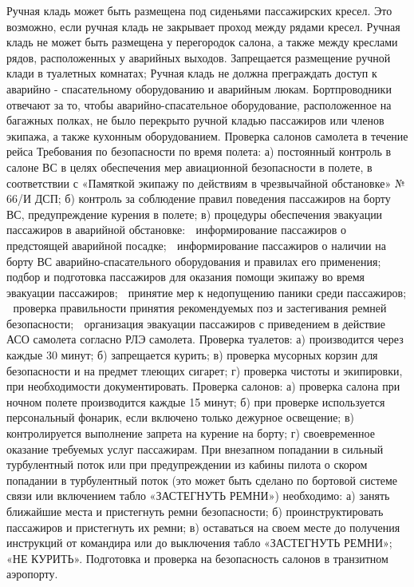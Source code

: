 Ручная кладь может быть размещена под сиденьями пассажирских кресел. Это возможно, если ручная кладь не закрывает проход между рядами кресел.
Ручная кладь не может быть размещена у перегородок салона, а также между креслами рядов, расположенных у аварийных выходов.
Запрещается размещение ручной клади в туалетных комнатах;
Ручная кладь не должна преграждать доступ к аварийно - спасательному оборудованию и аварийным люкам. Бортпроводники отвечают за то, чтобы аварийно-спасательное оборудование, расположенное на багажных полках, не было перекрыто ручной кладью пассажиров или членов экипажа, а также кухонным оборудованием.
Проверка салонов самолета в течение рейса
Требования по безопасности по время полета:
а)	постоянный контроль в салоне ВС в целях обеспечения мер авиационной безопасности в полете, в соответствии с «Памяткой экипажу по действиям в чрезвычайной обстановке» № 66/И ДСП;
б)	контроль за соблюдение правил поведения пассажиров на борту ВС, предупреждение курения в полете;
в)	процедуры обеспечения эвакуации пассажиров в аварийной обстановке:
	информирование пассажиров о предстоящей аварийной посадке;
	информирование пассажиров о наличии на борту ВС аварийно-спасательного оборудования и правилах его применения;
	подбор и подготовка пассажиров для оказания помощи экипажу во время эвакуации пассажиров;
	принятие мер к недопущению паники среди пассажиров;
	проверка правильности принятия рекомендуемых поз и застегивания ремней безопасности;
	организация эвакуации пассажиров с приведением в действие АСО самолета согласно РЛЭ самолета.
Проверка туалетов:
а)	производится через каждые 30 минут;
б)	запрещается курить;
в)	проверка мусорных корзин для безопасности и на предмет тлеющих сигарет;
г)	проверка чистоты и экипировки, при необходимости документировать.
Проверка салонов:
а)	проверка салона при ночном полете производится каждые 15 минут;
б)	при проверке используется персональный фонарик, если включено только дежурное освещение;
в)	контролируется выполнение запрета на курение на борту;
г)	своевременное оказание требуемых услуг пассажирам.
При внезапном попадании в сильный турбулентный поток или при предупреждении из кабины пилота о скором попадании в турбулентный поток (это может быть сделано по бортовой системе связи или включением табло «ЗАСТЕГНУТЬ РЕМНИ») необходимо:
а)	занять ближайшие места и пристегнуть ремни безопасности;
б)	проинструктировать пассажиров и пристегнуть их ремни;
в)	оставаться на своем месте до получения инструкций от командира или до выключения табло «ЗАСТЕГНУТЬ РЕМНИ»; «НЕ КУРИТЬ».
Подготовка и проверка на безопасность салонов в транзитном аэропорту.
